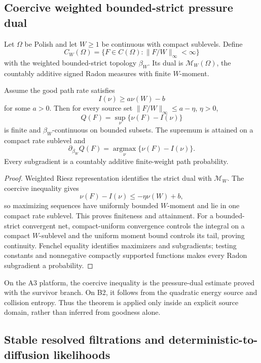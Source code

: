 \subsection{Coercive weighted bounded-strict pressure dual}

Let \(\Omega\) be Polish and let \(W\ge1\) be continuous with compact
sublevels.  Define
\[
 C_W(\Omega)=\{F\in C(\Omega):\|F/W\|_\infty<\infty\}
\]
with the weighted bounded-strict topology \(\beta_W\).  Its dual is
\(\mathcal M_W(\Omega)\), the countably additive signed Radon measures with
finite \(W\)-moment.

\begin{theorem}
\label{thm:r3-c2-strict}
Assume the good path rate satisfies
\[
 I(\nu)\ge a\nu(W)-b
\]
for some \(a>0\).  Then for every source set
\(\|F/W\|_\infty\le a-\eta\), \(\eta>0\),
\[
 Q(F)=\sup_\nu\{\nu(F)-I(\nu)\}
\]
is finite and \(\beta_W\)-continuous on bounded subsets.  The supremum is
attained on a compact rate sublevel and
\[
 \partial_{\beta_W}Q(F)
 =\operatorname*{argmax}_\nu\{\nu(F)-I(\nu)\}.
\]
Every subgradient is a countably additive finite-weight path probability.
\end{theorem}

\begin{proof}
Weighted Riesz representation identifies the strict dual with
\(\mathcal M_W\).  The coercive inequality gives
\[
 \nu(F)-I(\nu)
 \le -\eta\nu(W)+b,
\]
so maximizing sequences have uniformly bounded \(W\)-moment and lie in one
compact rate sublevel.  This proves finiteness and attainment.  For a
bounded-strict convergent net, compact-uniform convergence controls the
integral on a compact \(W\)-sublevel and the uniform moment bound controls its
tail, proving continuity.  Fenchel equality identifies maximizers and
subgradients; testing constants and nonnegative compactly supported functions
makes every Radon subgradient a probability.
\end{proof}

On the A3 platform, the coercive inequality is the pressure-dual estimate
proved with the survivor branch.  On B2, it follows from the quadratic energy
source and collision entropy.  Thus the theorem is applied only inside an
explicit source domain, rather than inferred from goodness alone.

\subsection{Stable resolved filtrations and deterministic-to-diffusion likelihoods}

